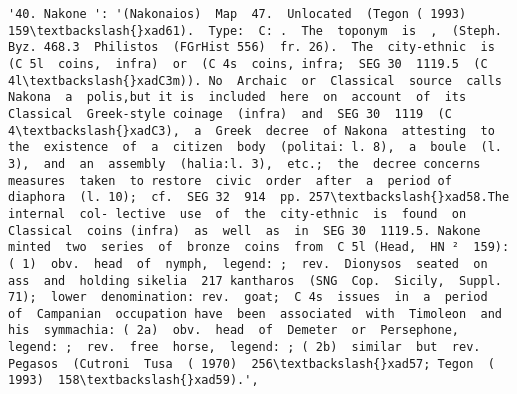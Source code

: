 \documentclass[11pt]{article}
\begin{document}
\begin{Verbatim}[commandchars=\\\{\}]
         '40. Nakone ': '(Nakonaios)  Map  47.  Unlocated  (Tegon ( 1993)  159\textbackslash{}xad61).  Type:  C: .  The  toponym  is  ,  (Steph. Byz. 468.3  Philistos  (FGrHist 556)  fr. 26).  The  city-ethnic  is (C 5l  coins,  infra)  or  (C 4s  coins, infra;  SEG 30  1119.5  (C 4l\textbackslash{}xadC3m)). No  Archaic  or  Classical  source  calls  Nakona  a  polis,but it is  included  here  on  account  of  its  Classical  Greek-style coinage  (infra)  and  SEG 30  1119  (C 4\textbackslash{}xadC3),  a  Greek  decree  of Nakona  attesting  to  the  existence  of  a  citizen  body  (politai: l. 8),  a  boule  (l. 3),  and  an  assembly  (halia:l. 3),  etc.;  the  decree concerns  measures  taken  to restore  civic  order  after  a  period of  diaphora  (l. 10);  cf.  SEG 32  914  pp. 257\textbackslash{}xad58.The  internal  col- lective  use  of  the  city-ethnic  is  found  on  Classical  coins (infra)  as  well  as  in  SEG 30  1119.5. Nakone  minted  two  series  of  bronze  coins  from  C 5l (Head,  HN ²  159):  ( 1)  obv.  head  of  nymph,  legend: ;  rev.  Dionysos  seated  on  ass  and  holding sikelia  217 kantharos  (SNG  Cop.  Sicily,  Suppl. 71);  lower  denomination: rev.  goat;  C 4s  issues  in  a  period  of  Campanian  occupation have  been  associated  with  Timoleon  and  his  symmachia: ( 2a)  obv.  head  of  Demeter  or  Persephone,  legend: ;  rev.  free  horse,  legend: ; ( 2b)  similar  but  rev.  Pegasos  (Cutroni  Tusa  ( 1970)  256\textbackslash{}xad57; Tegon  ( 1993)  158\textbackslash{}xad59).',

\end{Verbatim}
\end{document}
